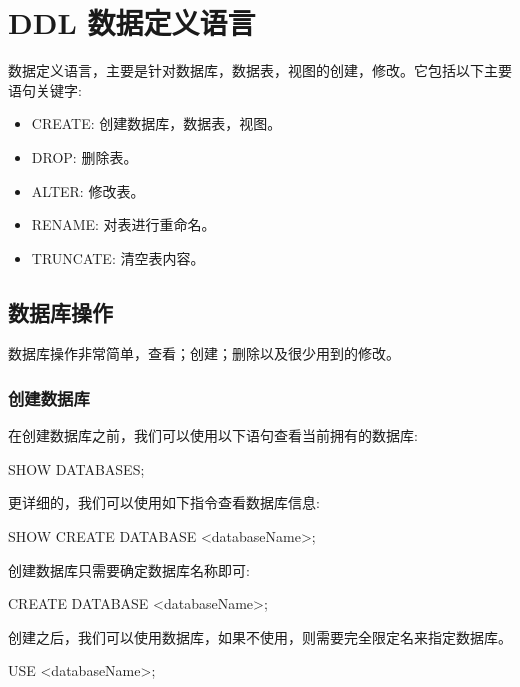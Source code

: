 \section{DDL 数据定义语言}

数据定义语言，主要是针对数据库，数据表，视图的创建，修改。它包括以下主要语句关键字:
\begin{itemize}
    \item CREATE: 创建数据库，数据表，视图。
    \item DROP: 删除表。
    \item ALTER: 修改表。
    \item RENAME: 对表进行重命名。
    \item TRUNCATE: 清空表内容。
\end{itemize}


\subsection{数据库操作}

数据库操作非常简单，查看；创建；删除以及很少用到的修改。

\subsubsection{创建数据库}

在创建数据库之前，我们可以使用以下语句查看当前拥有的数据库:

\begin{sql}
SHOW DATABASES;
\end{sql}

更详细的，我们可以使用如下指令查看数据库信息:

\begin{sql}
SHOW CREATE DATABASE <databaseName>;
\end{sql}

创建数据库只需要确定数据库名称即可:

\begin{sql}
CREATE DATABASE <databaseName>;
\end{sql}

创建之后，我们可以使用数据库，如果不使用，则需要完全限定名来指定数据库。

\begin{sql}
USE <databaseName>;
\end{sql}

